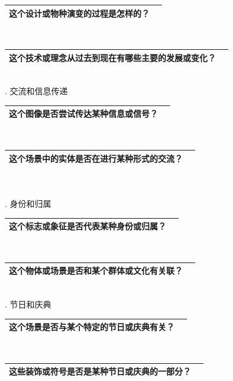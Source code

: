 \documentclass[12pt]{book}
\begin{document}
\begin{tabular}{|p{15cm}|p{3cm}|}
	\hline
这个设计或物种演变的过程是怎样的？\\
	\hline
\end{tabular}\\


\begin{tabular}{|p{15cm}|p{3cm}|}
	\hline
这个技术或理念从过去到现在有哪些主要的发展或变化？\\
	\hline
\end{tabular}\\

. 交流和信息传递

\begin{tabular}{|p{15cm}|p{3cm}|}
	\hline
这个图像是否尝试传达某种信息或信号？\\
	\hline
\end{tabular}\\



\begin{tabular}{|p{15cm}|p{3cm}|}
	\hline
这个场景中的实体是否在进行某种形式的交流？\\
	\hline
\end{tabular}\\\\



. 身份和归属

\begin{tabular}{|p{15cm}|p{3cm}|}
	\hline
这个标志或象征是否代表某种身份或归属？\\
	\hline
\end{tabular}\\


\begin{tabular}{|p{15cm}|p{3cm}|}
	\hline
这个物体或场景是否和某个群体或文化有关联？\\
	\hline
\end{tabular}\\


. 节日和庆典

\begin{tabular}{|p{15cm}|p{3cm}|}
	\hline
这个场景是否与某个特定的节日或庆典有关？\\
	\hline
\end{tabular}\\



\begin{tabular}{|p{15cm}|p{3cm}|}
	\hline
这些装饰或符号是否是某种节日或庆典的一部分？\\
	\hline
\end{tabular}\\
\end{document}
